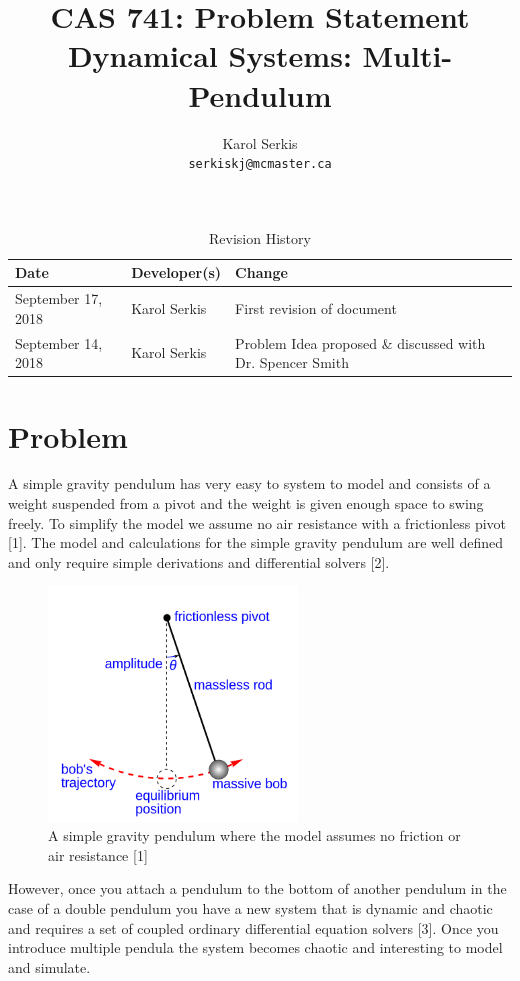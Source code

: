 \documentclass{article}
\title{CAS 741: Problem Statement\\[10pt]\Large Dynamical Systems: Multi-Pendulum }
\author{Karol Serkis\\\texttt{serkiskj@mcmaster.ca}}
\date{}
\begin{document}

\maketitle

\begin{table}[hp]
\caption{Revision History} \label{TblRevisionHistory}
\begin{tabularx}{\textwidth}{llX}
\toprule
\textbf{Date} & \textbf{Developer(s)} & \textbf{Change}\\
\midrule
September 17, 2018 & Karol Serkis & First revision of document\\

September 14, 2018 & Karol Serkis & Problem Idea proposed \& discussed with Dr. Spencer Smith \\
\bottomrule
\end{tabularx}
\end{table}

\section*{Problem}
A simple gravity pendulum has very easy to system to model and consists of a weight suspended from a pivot and the weight is given enough space to swing freely. To simplify the model we assume no air resistance with a frictionless pivot [1]. The model and calculations for the simple gravity pendulum are well defined and only require simple derivations and differential solvers [2].
\begin{figure}[H]
	\centering
	\includegraphics[width=250px]{simple-pend.png}
	\caption{A simple gravity pendulum where the model assumes no friction or air resistance [1]}
	\label{fig:maxresdefault}
\end{figure}

However, once you attach a pendulum to the bottom of another pendulum in the case of a double pendulum you have a new system that is dynamic and chaotic and requires a set of coupled ordinary differential equation solvers [3]. Once you introduce multiple pendula the system becomes chaotic and interesting to model and simulate.
\end{document}

